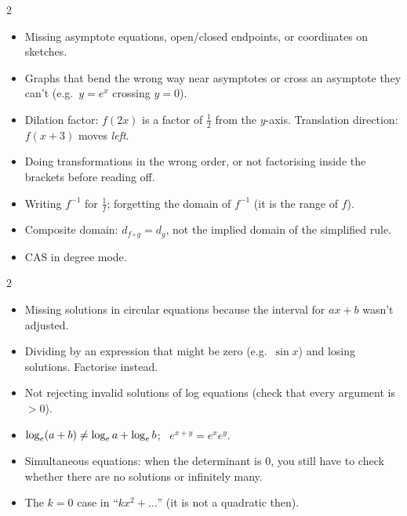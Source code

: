 \begin{warn}
\begin{multicols}{2}
\begin{itemize}
  \item Missing asymptote equations, open/closed endpoints, or coordinates on sketches.
  \item Graphs that bend the wrong way near asymptotes or cross an asymptote they can't (e.g.\ $y=e^x$ crossing $y=0$).
  \item Dilation factor: $f(2x)$ is a factor of $\frac12$ from the $y$-axis. Translation direction: $f(x+3)$ moves \emph{left}.
  \item Doing transformations in the wrong order, or not factorising inside the brackets before reading off.
  \item Writing $f^{-1}$ for $\frac1f$; forgetting the domain of $f^{-1}$ (it is the range of $f$).
  \item Composite domain: $d_{f\circ g}=d_g$, not the implied domain of the simplified rule.
  \item CAS in degree mode.
\end{itemize}
\end{multicols}
\end{warn}
\begin{warn}
\begin{multicols}{2}
\begin{itemize}
  \item Missing solutions in circular equations because the interval for $ax+b$ wasn't adjusted.
  \item Dividing by an expression that might be zero (e.g.\ $\sin x$) and losing solutions. Factorise instead.
  \item Not rejecting invalid solutions of log equations (check that every argument is $>0$).
  \item $\log_e(a+b)\ne\log_e a+\log_e b$; \ $e^{x+y}=e^xe^y$.
  \item Simultaneous equations: when the determinant is $0$, you still have to check whether there are no solutions or infinitely many.
  \item The $k=0$ case in ``$kx^2+\dots$'' (it is not a quadratic then).
\end{itemize}
\end{multicols}
\end{warn}
